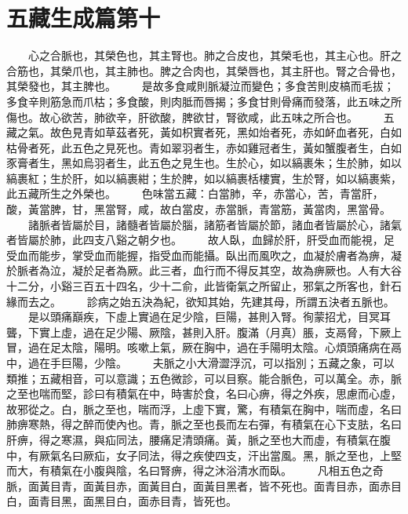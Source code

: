 \section{五藏生成篇第十}

　　心之合脈也，其榮色也，其主腎也。肺之合皮也，其榮毛也，其主心也。肝之合筋也，其榮爪也，其主肺也。脾之合肉也，其榮唇也，其主肝也。腎之合骨也，其榮發也，其主脾也。
　　是故多食咸則脈凝泣而變色；多食苦則皮槁而毛拔；多食辛則筋急而爪枯；多食酸，則肉胝而唇揭；多食甘則骨痛而發落，此五味之所傷也。故心欲苦，肺欲辛，肝欲酸，脾欲甘，腎欲咸，此五味之所合也。
　　五藏之氣。故色見青如草茲者死，黃如枳實者死，黑如炲者死，赤如衃血者死，白如枯骨者死，此五色之見死也。青如翠羽者生，赤如雞冠者生，黃如蟹腹者生，白如豕膏者生，黑如烏羽者生，此五色之見生也。生於心，如以縞裹朱；生於肺，如以縞裹紅；生於肝，如以縞裹紺；生於脾，如以縞裹栝樓實，生於腎，如以縞裹紫，此五藏所生之外榮也。
　　色味當五藏：白當肺，辛，赤當心，苦，青當肝，酸，黃當脾，甘，黑當腎，咸，故白當皮，赤當脈，青當筋，黃當肉，黑當骨。
　　諸脈者皆屬於目，諸髓者皆屬於腦，諸筋者皆屬於節，諸血者皆屬於心，諸氣者皆屬於肺，此四支八谿之朝夕也。
　　故人臥，血歸於肝，肝受血而能視，足受血而能步，掌受血而能握，指受血而能攝。臥出而風吹之，血凝於膚者為痹，凝於脈者為泣，凝於足者為厥。此三者，血行而不得反其空，故為痹厥也。人有大谷十二分，小谿三百五十四名，少十二俞，此皆衛氣之所留止，邪氣之所客也，針石緣而去之。
　　診病之始五決為紀，欲知其始，先建其母，所謂五決者五脈也。
　　是以頭痛巔疾，下虛上實過在足少陰，巨陽，甚則入腎。徇蒙招尤，目冥耳聾，下實上虛，過在足少陽、厥陰，甚則入肝。腹滿（月真）脹，支鬲脅，下厥上冒，過在足太陰，陽明。咳嗽上氣，厥在胸中，過在手陽明太陰。心煩頭痛病在鬲中，過在手巨陽，少陰。
　　夫脈之小大滑澀浮沉，可以指別；五藏之象，可以類推；五藏相音，可以意識；五色微診，可以目察。能合脈色，可以萬全。赤，脈之至也喘而堅，診曰有積氣在中，時害於食，名曰心痹，得之外疾，思慮而心虛，故邪從之。白，脈之至也，喘而浮，上虛下實，驚，有積氣在胸中，喘而虛，名曰肺痹寒熱，得之醉而使內也。青，脈之至也長而左右彈，有積氣在心下支胠，名曰肝痹，得之寒濕，與疝同法，腰痛足清頭痛。黃，脈之至也大而虛，有積氣在腹中，有厥氣名曰厥疝，女子同法，得之疾使四支，汗出當風。黑，脈之至也，上堅而大，有積氣在小腹與陰，名曰腎痹，得之沐浴清水而臥。
　　凡相五色之奇脈，面黃目青，面黃目赤，面黃目白，面黃目黑者，皆不死也。面青目赤，面赤目白，面青目黑，面黑目白，面赤目青，皆死也。



